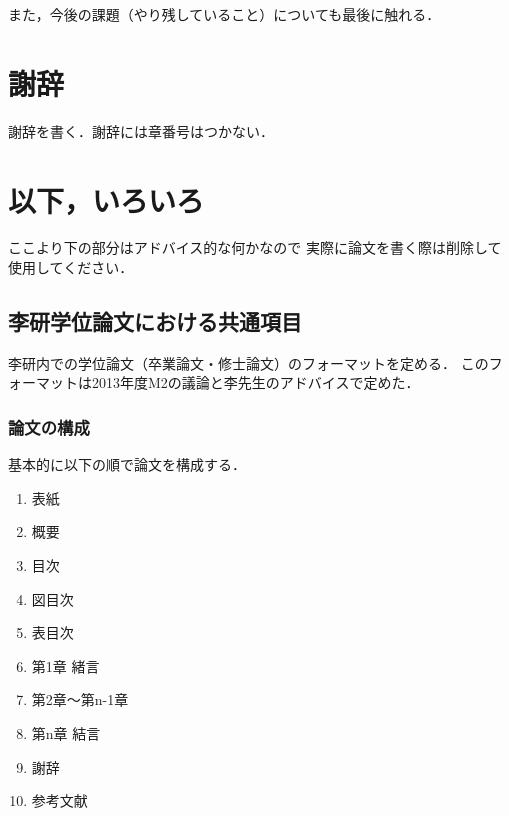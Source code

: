 \documentclass[12pt]{sonota/aislab}
\begin{document}
また，今後の課題（やり残していること）についても最後に触れる．

\chapter*{謝辞}
謝辞を書く．謝辞には章番号はつかない．

\appendix
\chapter{以下，いろいろ}
ここより下の部分はアドバイス的な何かなので
実際に論文を書く際は削除して使用してください．

\section{李研学位論文における共通項目}
李研内での学位論文（卒業論文・修士論文）のフォーマットを定める．
このフォーマットは2013年度M2の議論と李先生のアドバイスで定めた．
\subsection{論文の構成}
基本的に以下の順で論文を構成する．
\begin{enumerate}
\item 表紙
\item 概要
\item 目次
\item 図目次
\item 表目次
\item 第1章 緒言
\item 第2章～第n-1章
\item 第n章 結言
\item 謝辞
\item 参考文献
\end{enumerate}
\end{document}
